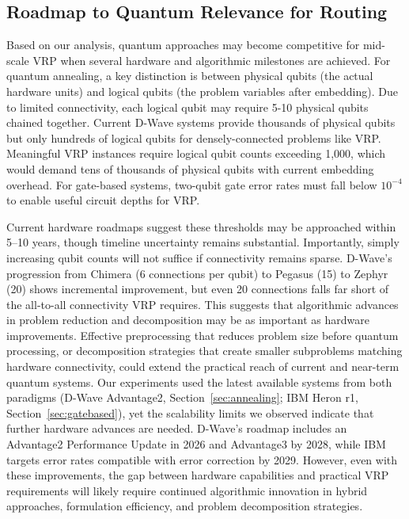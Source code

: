 \documentclass[preprint,3p,12pt,authoryear]{elsarticle}
\begin{document}
\subsection{Roadmap to Quantum Relevance for Routing}

Based on our analysis, quantum approaches may become competitive for mid-scale VRP when several hardware and algorithmic milestones are achieved. For quantum annealing, a key distinction is between physical qubits (the actual hardware units) and logical qubits (the problem variables after embedding). Due to limited connectivity, each logical qubit may require 5-10 physical qubits chained together. Current D-Wave systems provide thousands of physical qubits but only hundreds of logical qubits for densely-connected problems like VRP. Meaningful VRP instances require logical qubit counts exceeding 1,000, which would demand tens of thousands of physical qubits with current embedding overhead. For gate-based systems, two-qubit gate error rates must fall below $10^{-4}$ to enable useful circuit depths for VRP.

Current hardware roadmaps suggest these thresholds may be approached within 5--10 years, though timeline uncertainty remains substantial. Importantly, simply increasing qubit counts will not suffice if connectivity remains sparse. D-Wave's progression from Chimera (6 connections per qubit) to Pegasus (15) to Zephyr (20) shows incremental improvement, but even 20 connections falls far short of the all-to-all connectivity VRP requires. This suggests that algorithmic advances in problem reduction and decomposition may be as important as hardware improvements. Effective preprocessing that reduces problem size before quantum processing, or decomposition strategies that create smaller subproblems matching hardware connectivity, could extend the practical reach of current and near-term quantum systems. Our experiments used the latest available systems from both paradigms (D-Wave Advantage2, Section~\ref{sec:annealing}; IBM Heron r1, Section~\ref{sec:gatebased}), yet the scalability limits we observed indicate that further hardware advances are needed. D-Wave's roadmap includes an Advantage2 Performance Update in 2026 and Advantage3 by 2028, while IBM targets error rates compatible with error correction by 2029. However, even with these improvements, the gap between hardware capabilities and practical VRP requirements will likely require continued algorithmic innovation in hybrid approaches, formulation efficiency, and problem decomposition strategies.
\end{document}
